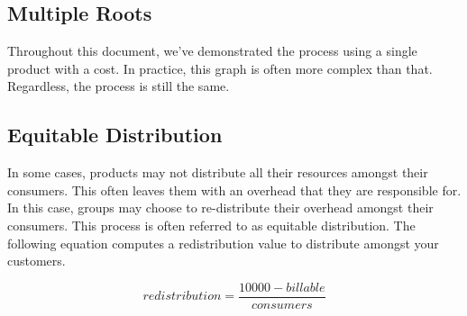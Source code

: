 \documentclass[10pt, a4paper, twocolumn]{article}
\begin{document}
  \subsection*{Multiple Roots}
    Throughout this document, we've demonstrated the process using a single product with a cost.
    In practice, this graph is often more complex than that.
    Regardless, the process is still the same.

  \subsection*{Equitable Distribution}
    In some cases, products may not distribute all their resources amongst their consumers.
    This often leaves them with an overhead that they are responsible for.
    In this case, groups may choose to re-distribute their overhead amongst their consumers.
    This process is often referred to as equitable distribution.
    The following equation computes a redistribution value to distribute amongst your customers.

    \[ redistribution = \frac{10000 - billable}{consumers} \]

\printbibliography
\end{document}
